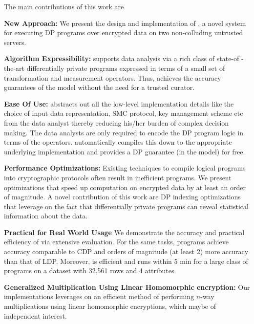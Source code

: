 The main contributions of this work are
\squishlist
\item \textbf{New Approach:} We present the design and implementation of \system, a novel system for executing DP programs over encrypted data on two non-colluding untrusted servers. %
\item \textbf{Algorithm Expressibility:} \system supports data analysis via a rich class of state-of -the-art differentially private programs expressed in terms of a small set of transformation and measurement operators. Thus, \system achieves the accuracy guarantees of the \cdp model without the need for a trusted curator.  
\item \textbf{Ease Of Use:} \system abstracts out all the low-level implementation details like the choice of input data representation, SMC protocol, key management scheme etc from the data analyst thereby reducing his/her burden of complex decision making. The data analysts are only required to encode the DP program logic in terms of the \system operators. \system automatically compiles this down to the appropriate underlying implementation and provides a DP guarantee (in the \cdp model) for free. 
\item \textbf{Performance Optimizations:} Existing techniques to compile logical \system programs into cryptographic protocols often result in inefficient programs. We present optimizations that speed up computation on encrypted data by at least an order of magnitude. A novel contribution of this work are DP indexing optimizations that leverage on the fact that differentially private programs can reveal statistical information about the data. 
\item \textbf{Practical for Real World Usage} We demonstrate the accuracy and practical efficiency of \system via extensive  evaluation. For the same tasks, \system programs achieve accuracy comparable to \textsf{CDP} and orders of magnitude (at least 2) more accuracy than that of \textsf{LDP}. Moreover, \system is efficient and runs within 5 min for a large class of programs on a dataset with 32,561 rows and 4 attributes. 
\item \textbf{Generalized Multiplication Using Linear Homomorphic encryption:} Our implementations leverages on an efficient method of performing $n$-way multiplications using linear homomorphic encryptions, which maybe of independent interest.
\squishend
\cbend
